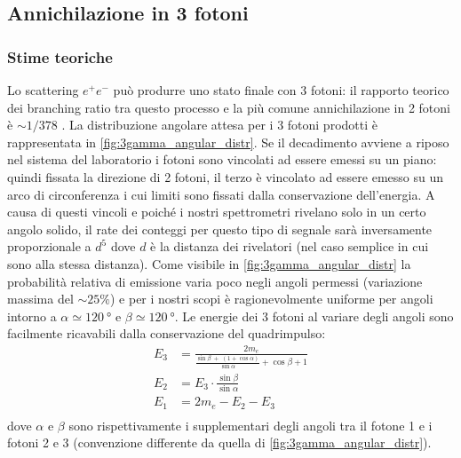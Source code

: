 \subsection{Annichilazione in 3 fotoni}

\subsubsection{Stime teoriche}
Lo scattering $e^+e^-$ può produrre uno stato finale con 3 fotoni: il rapporto teorico dei branching ratio tra questo processo e la più comune annichilazione in 2 fotoni è $\sim 1/378$ \cite{4}. La distribuzione angolare attesa per i 3 fotoni prodotti è rappresentata in \autoref{fig:3gamma_angular_distr}. Se il decadimento avviene a riposo nel sistema del laboratorio i fotoni sono vincolati ad essere emessi su un piano: quindi fissata la direzione di 2 fotoni, il terzo è vincolato ad essere emesso su un arco di circonferenza i cui limiti sono fissati dalla conservazione dell'energia. A causa di questi vincoli e poiché i nostri spettrometri rivelano solo in un certo angolo solido, il rate dei conteggi per questo tipo di segnale sarà inversamente proporzionale a $d^5$ dove $d$ è la distanza dei rivelatori (nel caso semplice in cui sono alla stessa distanza).
Come visibile in \autoref{fig:3gamma_angular_distr} la probabilità relativa di emissione varia poco negli angoli permessi (variazione massima del $\sim 25\%$) e per i nostri scopi è ragionevolmente uniforme per angoli intorno a $\alpha\simeq \SI{120}{\degree}$ e $\beta\simeq\SI{120}{\degree}$.
Le energie dei 3 fotoni al variare degli angoli sono facilmente ricavabili dalla conservazione del quadrimpulso:
\begin{align*}
\label{eq:3gamma_energy}
E_3 &= \frac{2 m_e}{\frac{\sin\beta \;+\;(1+\cos\alpha)}{\sin\alpha}+\cos\beta+1}\\
E_2 &= E_3 \cdot \frac{\sin\beta}{\sin\alpha}\\
E_1 &= 2m_e - E_2 - E_3\\
\end{align*}
dove $\alpha$ e $\beta$ sono rispettivamente i supplementari degli angoli tra il fotone 1 e i fotoni 2 e 3
(convenzione differente da quella di \autoref{fig:3gamma_angular_distr}).

